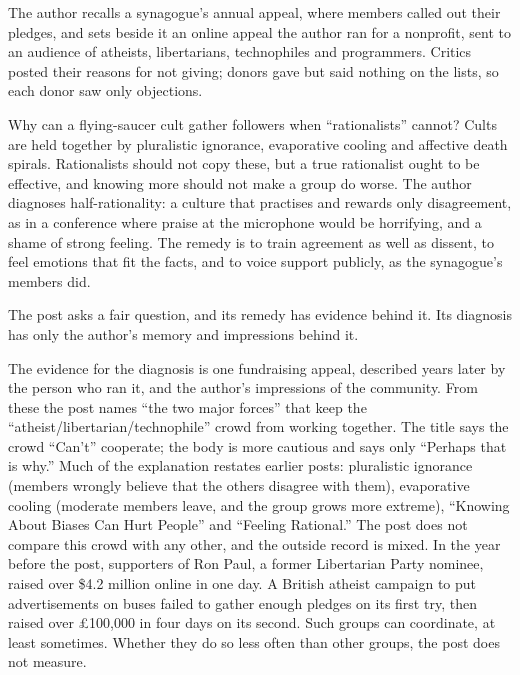 \begin{afterword}
\summaryhead

The author recalls a synagogue's annual appeal, where members called out their pledges, and sets beside it an online appeal the author ran for a nonprofit, sent to an audience of atheists, libertarians, technophiles and programmers. Critics posted their reasons for not giving; donors gave but said nothing on the lists, so each donor saw only objections.

Why can a flying-saucer cult gather followers when ``rationalists'' cannot? Cults are held together by pluralistic ignorance, evaporative cooling and affective death spirals. Rationalists should not copy these, but a true rationalist ought to be effective, and knowing more should not make a group do worse. The author diagnoses half-rationality: a culture that practises and rewards only disagreement, as in a conference where praise at the microphone would be horrifying, and a shame of strong feeling. The remedy is to train agreement as well as dissent, to feel emotions that fit the facts, and to voice support publicly, as the synagogue's members did.

\responsehead

The post asks a fair question, and its remedy has evidence behind it. Its diagnosis has only the author's memory and impressions behind it.

The evidence for the diagnosis is one fundraising appeal, described years later by the person who ran it, and the author's impressions of the community. From these the post names ``the two major forces'' that keep the ``atheist\slash{}libertarian\slash{}technophile'' crowd from working together. The title says the crowd ``Can't'' cooperate; the body is more cautious and says only ``Perhaps that is why.'' Much of the explanation restates earlier posts: pluralistic ignorance (members wrongly believe that the others disagree with them), evaporative cooling (moderate members leave, and the group grows more extreme), ``Knowing About Biases Can Hurt People'' and ``Feeling Rational.'' The post does not compare this crowd with any other, and the outside record is mixed. In the year before the post, supporters of Ron Paul, a former Libertarian Party nominee, raised over \$4.2 million online in one day. A British atheist campaign to put advertisements on buses failed to gather enough pledges on its first try, then raised over \pounds100,000 in four days on its second. Such groups can coordinate, at least sometimes. Whether they do so less often than other groups, the post does not measure.


\end{afterword}
